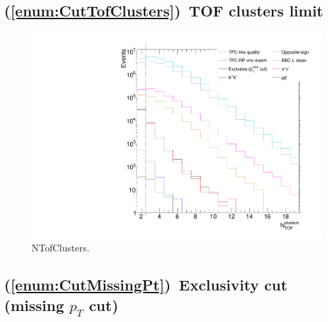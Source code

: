 


\subsection{(\ref{enum:CutTofClusters})~TOF clusters limit}

\begin{figure}[ht!]
\centering%
\includegraphics[width=0.475\linewidth,page=1]{graphics/eventSelection/NTofClusters.pdf}%
\caption{NTofClusters.}\label{fig:NTofClusters}%
\end{figure}

\subsection{(\ref{enum:CutMissingPt})~Exclusivity cut (missing \texorpdfstring{$p_{T}$}{pT} cut)}


